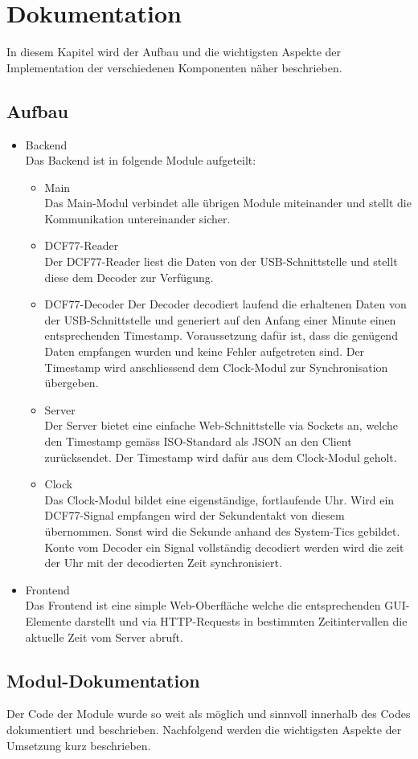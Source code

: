 
\chapter{Dokumentation}
In diesem Kapitel wird der Aufbau und die wichtigsten Aspekte der Implementation der verschiedenen Komponenten näher beschrieben.

\section{Aufbau}
\begin{itemize}
\item {Backend}\\
Das Backend ist in folgende Module aufgeteilt:
\begin{itemize}
\item {Main} \\
Das Main-Modul verbindet alle übrigen Module miteinander und stellt die Kommunikation untereinander sicher.
\item {DCF77-Reader} \\
Der DCF77-Reader liest die Daten von der USB-Schnittstelle und stellt diese dem Decoder zur Verfügung.
\item {DCF77-Decoder}
Der Decoder decodiert laufend die erhaltenen Daten von der USB-Schnittstelle und generiert auf den Anfang einer Minute einen entsprechenden Timestamp. Voraussetzung dafür ist, dass die genügend Daten empfangen wurden und keine Fehler aufgetreten sind. Der Timestamp wird anschliessend dem Clock-Modul zur Synchronisation übergeben.
\item {Server}\\
Der Server bietet eine einfache Web-Schnittstelle via Sockets an, welche den Timestamp gemäss ISO-Standard als JSON an den Client zurücksendet. Der Timestamp wird dafür aus dem Clock-Modul geholt.
\item {Clock}\\
Das Clock-Modul bildet eine eigenständige, fortlaufende Uhr. Wird ein DCF77-Signal empfangen wird der Sekundentakt von diesem übernommen. Sonst wird die Sekunde anhand des System-Tics gebildet. Konte vom Decoder ein Signal vollständig decodiert werden wird die zeit der Uhr mit der decodierten Zeit synchronisiert.
\end{itemize} 
\item {Frontend}\\
Das Frontend ist eine simple Web-Oberfläche welche die entsprechenden GUI-Elemente darstellt und via HTTP-Requests in bestimmten Zeitintervallen die aktuelle Zeit vom Server abruft.
\end{itemize}

\section{Modul-Dokumentation}
Der Code der Module wurde so weit als möglich und sinnvoll innerhalb des Codes dokumentiert und beschrieben. Nachfolgend werden die wichtigsten Aspekte der Umsetzung kurz beschrieben.

